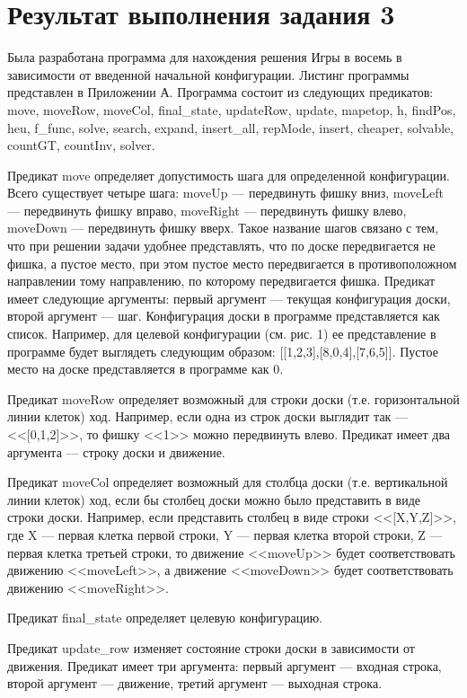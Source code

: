 \documentclass{article}
\begin{document}
\section*{Результат выполнения задания 3}
Была разработана программа для нахождения решения Игры в восемь в
зависимости от введенной начальной конфигурации. Листинг программы
представлен в Приложении А. Программа состоит из следующих предикатов:
move, moveRow, moveCol, final\_state, updateRow, update, mapetop, h,
findPos, heu, f\_func, solve, search, expand, insert\_all, repMode,
insert, cheaper, solvable, countGT, countInv, solver.

Предикат move определяет допустимость шага для определенной
конфигурации. Всего существует четыре шага: moveUp --- передвинуть
фишку вниз, moveLeft --- передвинуть фишку вправо, moveRight ---
передвинуть фишку влево, moveDown --- передвинуть фишку вверх. Такое
название шагов связано с тем, что при решении задачи удобнее
представлять, что по доске передвигается не фишка, а пустое место, при
этом пустое место передвигается в противоположном направлении тому
направлению, по которому передвигается фишка. Предикат имеет следующие
аргументы: первый аргумент --- текущая конфигурация доски, второй
аргумент --- шаг. Конфигурация доски в программе представляется как
список. Например, для целевой конфигурации (см. рис. 1) ее
представление в программе будет выглядеть следующим образом:
[[1,2,3],[8,0,4],[7,6,5]]. Пустое место на доске представляется в программе как 0.

Предикат moveRow определяет возможный для строки доски
(т.е. горизонтальной линии клеток) ход. Например, если одна из
строк доски выглядит так --- <<[0,1,2]>>, то фишку <<1>> можно
передвинуть влево. Предикат имеет два аргумента --- строку доски и
движение.

Предикат moveCol определяет возможный для столбца доски
(т.е. вертикальной линии клеток) ход, если бы столбец доски можно было
представить в виде строки доски. Например, если представить столбец в
виде строки <<[X,Y,Z]>>, где X --- первая клетка первой строки, Y ---
первая клетка второй строки, Z --- первая клетка третьей строки, то
движение <<moveUp>> будет соответствовать движению <<moveLeft>>, а
движение <<moveDown>> будет соответствовать движению <<moveRight>>.

Предикат final\_state определяет целевую конфигурацию.

Предикат update\_row изменяет состояние строки доски в зависимости от
движения. Предикат имеет три аргумента: первый аргумент --- входная
строка, второй аргумент --- движение, третий аргумент --- выходная
строка.
\end{document}
